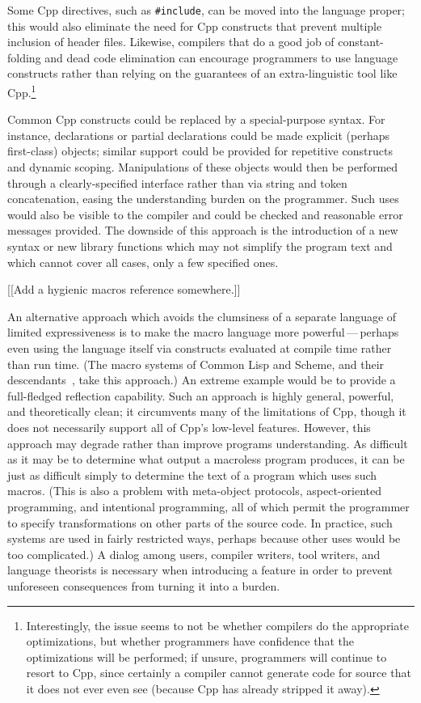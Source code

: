 \documentclass[10pt]{article}
\begin{document}
Some Cpp directives, such as {\tt \#include}, can be moved into the
language proper; this would also eliminate the need for Cpp constructs that
prevent multiple inclusion of header files.  Likewise, compilers that do a
good job of constant-folding and dead code elimination can encourage
programmers to use language constructs rather than relying on the
guarantees of an extra-linguistic tool like Cpp.\footnote{Interestingly,
  the issue seems to not be whether compilers do the appropriate
  optimizations, but whether programmers have confidence that the
  optimizations will be performed; if unsure, programmers will continue to
  resort to Cpp, since certainly a compiler cannot generate code for source
  that it does not ever even see (because Cpp has already stripped it
  away).}

Common Cpp constructs could be replaced by a special-purpose syntax.  For
instance, declarations or partial declarations could be made explicit
(perhaps first-class) objects; similar support could be provided for
repetitive constructs and dynamic scoping.  Manipulations of these objects
would then be performed through a clearly-specified interface rather than
via string and token concatenation, easing the understanding burden on the
programmer.  Such uses would also be visible to the compiler and could be
checked and reasonable error messages provided.  The downside of this
approach is the introduction of a new syntax or new library functions which
may not simplify the program text and which cannot cover all cases, only a
few specified ones.

[[Add a hygienic macros reference somewhere.]]

An alternative approach which avoids the clumsiness of a separate language
of limited expressiveness is to make the macro language more
powerful\,---\,perhaps even using the language itself via constructs
evaluated at compile time rather than run time.  (The macro systems of
Common Lisp and Scheme, and their descendants~\cite{WeiseC93}, take this
approach.)  An extreme example would be to provide a full-fledged
reflection capability.  Such an approach is highly general, powerful, and
theoretically clean; it circumvents many of the limitations of Cpp,
though it does not necessarily support all of Cpp's low-level features.
However, this approach may degrade rather than improve programs
understanding.  As difficult as it may be to determine what output a
macroless program produces, it can be just as difficult simply to determine
the text of a program which uses such macros.  (This is also a problem with
meta-object protocols, aspect-oriented programming, and intentional
programming, all of which permit the programmer to specify transformations
on other parts of the source code.  In practice, such systems are used in
fairly restricted ways, perhaps because other uses would be too
complicated.)  A dialog among users, compiler writers, tool writers, and
language theorists is necessary when introducing a feature in order to
prevent unforeseen consequences from turning it into a burden.
\end{document}
